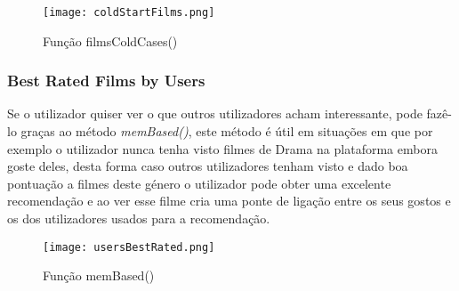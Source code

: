 \begin{figure}[H]
\centering
\texttt{[image: coldStartFilms.png]}
\caption {Função filmsColdCases()}
\label {fig05}
\end{figure}

\subsubsection{Best Rated Films by Users}

\par Se o utilizador quiser ver o que outros utilizadores acham interessante, pode fazê-lo graças ao método \textit{memBased()}, este método é útil em situações em que por exemplo o utilizador nunca tenha visto filmes de Drama na plataforma embora goste deles, desta forma caso outros utilizadores tenham visto e dado boa pontuação a filmes deste género o utilizador pode obter uma excelente recomendação e ao ver esse filme cria uma ponte de ligação entre os seus gostos e os dos utilizadores usados para a recomendação.

\begin{figure}[H]
\centering
\texttt{[image: usersBestRated.png]}
\caption {Função memBased()}
\label {fig06}
\end{figure}


\newpage

